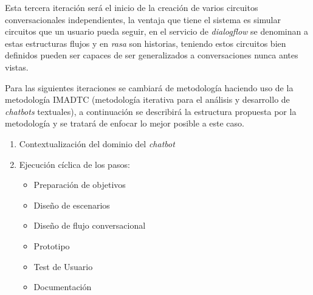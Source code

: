 \documentclass[letter, openright, 12pt]{book}
\begin{document}
Esta tercera iteración será el inicio de la creación de varios circuitos conversacionales independientes, la ventaja que tiene el sistema es simular circuitos que un usuario pueda seguir, en el servicio de {\it dialogflow} se denominan a estas estructuras flujos y en {\it rasa} son historias, teniendo estos circuitos bien definidos pueden ser capaces de ser generalizados a conversaciones nunca antes vistas. 
\par 
Para las siguientes iteraciones se cambiará de metodología haciendo uso de la metodología IMADTC (metodología iterativa para el análisis y desarrollo de {\it chatbots} textuales), a continuación se describirá la estructura  propuesta por la metodología y se tratará de enfocar lo mejor posible a este caso. 
\begin{enumerate}
\item Contextualización del dominio del {\it chatbot}
\item Ejecución cíclica de los pasos:
	\begin{itemize}
	\item Preparación de objetivos
	\item Diseño de escenarios
	\item Diseño de flujo conversacional
	\item Prototipo
	\item Test de Usuario
	\item Documentación
	\end{itemize}
\end{enumerate}
\end{document}

